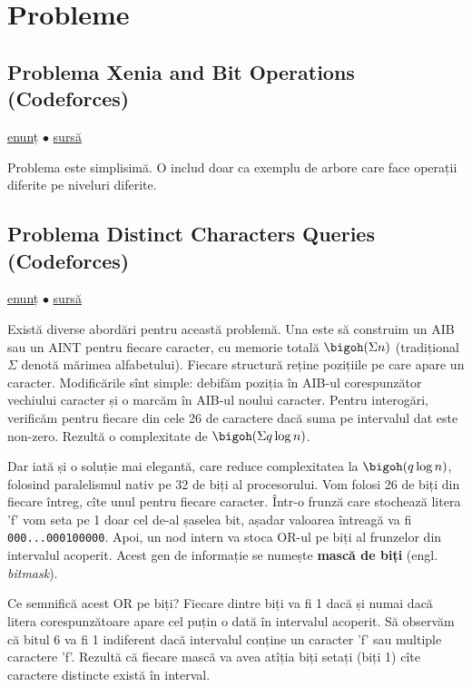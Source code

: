 \section{Probleme}

\subsection{Problema Xenia and Bit Operations (Codeforces)}

\href{https://codeforces.com/contest/339/problem/D}{enunț}
$\bullet$
\href{https://codeforces.com/contest/339/submission/280956091}{sursă}

Problema este simplisimă. O includ doar ca exemplu de arbore care face operații diferite pe niveluri diferite.

\subsection{Problema Distinct Characters Queries (Codeforces)}

\href{https://codeforces.com/contest/1234/problem/D}{enunț}
$\bullet$
\href{https://codeforces.com/contest/1234/submission/341304487}{sursă}

Există diverse abordări pentru această problemă. Una este să construim un AIB sau un AINT pentru fiecare caracter, cu memorie totală $\bigoh(\Sigma n)$ (tradițional $\Sigma$ denotă mărimea alfabetului). Fiecare structură reține pozițiile pe care apare un caracter. Modificările sînt simple: debifăm poziția în AIB-ul corespunzător vechiului caracter și o marcăm în AIB-ul noului caracter. Pentru interogări, verificăm pentru fiecare din cele 26 de caractere dacă suma pe intervalul dat este non-zero. Rezultă o complexitate de $\bigoh(\Sigma q \log n)$.

Dar iată și o soluție mai elegantă, care reduce complexitatea la $\bigoh(q \log n)$, folosind paralelismul nativ pe 32 de biți al procesorului. Vom folosi 26 de biți din fiecare întreg, cîte unul pentru fiecare caracter. Într-o frunză care stochează litera 'f' vom seta pe 1 doar cel de-al șaselea bit, așadar valoarea întreagă va fi \texttt{000...000100000}. Apoi, un nod intern va stoca OR-ul pe biți al frunzelor din intervalul acoperit. Acest gen de informație se numește \textbf{mască de biți} (engl. \textit{bitmask}).

Ce semnifică acest OR pe biți? Fiecare dintre biți va fi 1 dacă și numai dacă litera corespunzătoare apare cel puțin o dată în intervalul acoperit. Să observăm că bitul 6 va fi 1 indiferent dacă intervalul conține un caracter 'f' sau multiple caractere 'f'. Rezultă că fiecare mască va avea atîția biți setați (biți 1) cîte caractere distincte există în interval.

